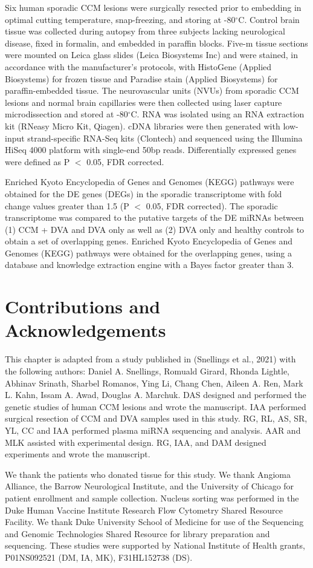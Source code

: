 Six human sporadic CCM lesions were surgically resected prior to embedding in optimal cutting temperature, snap-freezing, and storing at -80$^{\circ}$C. Control brain tissue was collected during autopsy from three subjects lacking neurological disease, fixed in formalin, and embedded in paraffin blocks. Five-\textmu m tissue sections were mounted on Leica glass slides (Leica Biosystems Inc) and were stained, in accordance with the manufacturer’s protocols, with HistoGene (Applied Biosystems) for frozen tissue and Paradise stain (Applied Biosystems) for paraffin-embedded tissue. The neurovascular units (NVUs) from sporadic CCM lesions and normal brain capillaries were then collected using laser capture microdissection and stored at -80$^{\circ}$C. RNA was isolated using an RNA extraction kit (RNeasy Micro Kit, Qiagen). cDNA libraries were then generated with low-input strand-specific RNA-Seq kits (Clontech) and sequenced using the Illumina HiSeq 4000 platform with single-end 50bp reads. Differentially expressed genes were defined as P $<$ 0.05, FDR corrected. 

Enriched Kyoto Encyclopedia of Genes and Genomes (KEGG) pathways\citep{kanehisa2021, kanehisa2000} were obtained for the DE genes (DEGs) in the sporadic transcriptome with fold change values greater than 1.5 (P $<$ 0.05, FDR corrected). The sporadic transcriptome was compared to the putative targets of the DE miRNAs between (1) CCM + DVA and DVA only as well as (2) DVA only and healthy controls to obtain a set of overlapping genes. Enriched Kyoto Encyclopedia of Genes and Genomes (KEGG) pathways were obtained for the overlapping genes, using a database and knowledge extraction engine with a Bayes factor greater than 3. 

\section{Contributions and Acknowledgements}
This chapter is adapted from a study published in  (Snellings et al., 2021) with the following authors: Daniel A. Snellings, Romuald Girard, Rhonda Lightle, Abhinav Srinath, Sharbel Romanos, Ying Li, Chang Chen, Aileen A. Ren, Mark L. Kahn, Issam A. Awad, Douglas A. Marchuk. DAS designed and performed the genetic studies of human CCM lesions and wrote the manuscript. IAA performed surgical resection of CCM and DVA samples used in this study. RG, RL, AS, SR, YL, CC and IAA performed plasma miRNA sequencing and analysis. AAR and MLK assisted with experimental design. RG, IAA, and DAM designed experiments and wrote the manuscript.

We thank the patients who donated tissue for this study. We thank Angioma Alliance, the Barrow Neurological Institute, and the University of Chicago for patient enrollment and sample collection. Nucleus sorting was performed in the Duke Human Vaccine Institute Research Flow Cytometry Shared Resource Facility. We thank Duke University School of Medicine for use of the Sequencing and Genomic Technologies Shared Resource for library preparation and sequencing. These studies were supported by National Institute of Health grants, P01NS092521 (DM, IA, MK), F31HL152738 (DS).
